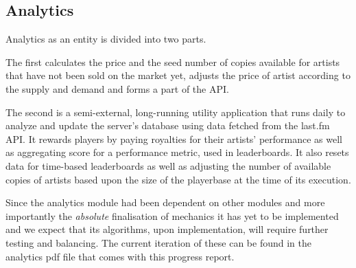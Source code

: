 \documentclass[a4paper,10pt,twoside]{article}
\begin{document}
\subsection{Analytics}
Analytics as an entity is divided into two parts.

The first calculates the price and the seed number of copies available for artists that have not been sold on the market yet, adjusts the price of artist according to the supply and demand and forms a part of the API.

The second is a semi-external, long-running utility application that runs daily to analyze and update the server's database using data fetched from the last.fm API. It rewards players by paying royalties for their artists' performance as well as aggregating score for a performance metric, used in leaderboards. It also resets data for time-based leaderboards as well as adjusting the number of available copies of artists based upon the size of the playerbase at the time of its execution.

Since the analytics module had been dependent on other modules and more importantly the \emph{absolute} finalisation of mechanics it has yet to be implemented and we expect that its algorithms, upon implementation, will require further testing and balancing. The current iteration of these can be found in the analytics pdf file that comes with this progress report.
\end{document}
